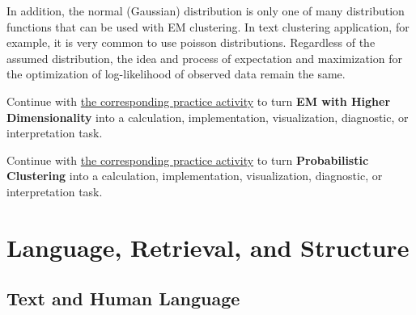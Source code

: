\documentclass[
  letterpaper,
]{scrbook}
\begin{document}
In addition, the normal (Gaussian) distribution is only one of many
distribution functions that can be used with EM clustering. In text
clustering application, for example, it is very common to use poisson
distributions. Regardless of the assumed distribution, the idea and
process of expectation and maximization for the optimization of
log-likelihood of observed data remain the same.

\begin{tcolorbox}[enhanced jigsaw, arc=.35mm, bottomrule=.15mm, bottomtitle=1mm, breakable, colback=white, colbacktitle=quarto-callout-tip-color!10!white, colframe=quarto-callout-tip-color-frame, coltitle=black, left=2mm, leftrule=.75mm, opacityback=0, opacitybacktitle=0.6, rightrule=.15mm, title=\textcolor{quarto-callout-tip-color}{\faLightbulb}\hspace{0.5em}{Put it into practice}, titlerule=0mm, toprule=.15mm, toptitle=1mm]

Continue with \hyperref[sec-pr-10-em-with-higher-dimensionality]{the
corresponding practice activity} to turn \textbf{EM with Higher
Dimensionality} into a calculation, implementation, visualization,
diagnostic, or interpretation task.

\end{tcolorbox}

\begin{tcolorbox}[enhanced jigsaw, arc=.35mm, bottomrule=.15mm, bottomtitle=1mm, breakable, colback=white, colbacktitle=quarto-callout-tip-color!10!white, colframe=quarto-callout-tip-color-frame, coltitle=black, left=2mm, leftrule=.75mm, opacityback=0, opacitybacktitle=0.6, rightrule=.15mm, title=\textcolor{quarto-callout-tip-color}{\faLightbulb}\hspace{0.5em}{Put it into practice}, titlerule=0mm, toprule=.15mm, toptitle=1mm]

Continue with \hyperref[sec-pr-10-probabilistic-clustering]{the
corresponding practice activity} to turn \textbf{Probabilistic
Clustering} into a calculation, implementation, visualization,
diagnostic, or interpretation task.

\end{tcolorbox}

\part{Language, Retrieval, and Structure}

\chapter{Text and Human Language}\label{ch-text}
\end{document}
